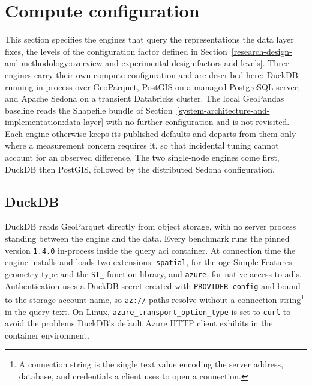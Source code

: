 \section{Compute configuration}
\label{system-architecture-and-implementation:compute-configuration}
This section specifies the engines that query the representations the data layer fixes, the levels of the configuration factor defined in Section~\ref{research-design-and-methodology:overview-and-experimental-design:factors-and-levels}. Three engines carry their own compute configuration and are described here: DuckDB running in-process over GeoParquet, PostGIS on a managed PostgreSQL server, and Apache Sedona on a transient Databricks cluster. The local GeoPandas baseline reads the Shapefile bundle of Section~\ref{system-architecture-and-implementation:data-layer} with no further configuration and is not revisited. Each engine otherwise keeps its published defaults and departs from them only where a measurement concern requires it, so that incidental tuning cannot account for an observed difference. The two single-node engines come first, DuckDB then PostGIS, followed by the distributed Sedona configuration.

\subsection{DuckDB}
\label{system-architecture-and-implementation:compute-configuration:duckdb}

DuckDB reads GeoParquet directly from object storage, with no server process standing between the engine and the data. Every benchmark runs the pinned version \texttt{1.4.0} in-process inside the query \acrshort{aci} container. At connection time the engine installs and loads two extensions: \texttt{spatial}, for the \acrshort{ogc} Simple Features geometry type and the \texttt{ST\_} function library, and \texttt{azure}, for native access to \acrshort{adls}. Authentication uses a DuckDB secret created with \texttt{PROVIDER config} and bound to the storage account name, so \texttt{az://} paths resolve without a connection string\footnote{A connection string is the single text value encoding the server address, database, and credentials a client uses to open a connection.} in the query text. On Linux, \texttt{azure\_transport\_option\_type} is set to \texttt{curl} to avoid the problems DuckDB's default Azure HTTP client exhibits in the container environment.

